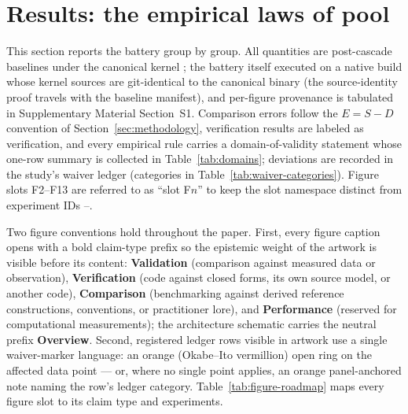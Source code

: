 \section{Results: the empirical laws of pool}
\label{sec:results}

This section reports the battery group by group. All quantities are
post-cascade baselines under the canonical kernel ;
the battery itself executed on a native build whose kernel sources are
git-identical to the canonical binary (the source-identity proof travels
with the baseline manifest), and per-figure provenance is tabulated in
Supplementary Material Section~S1. Comparison errors follow the
$E = S - D$ convention of Section~\ref{sec:methodology}, verification
results are labeled as verification, and every empirical rule carries a
domain-of-validity statement whose one-row summary is collected in
Table~\ref{tab:domains}; deviations are recorded in the study's waiver
ledger (categories in Table~\ref{tab:waiver-categories}). Figure slots F2--F13 are referred to as ``slot F$n$'' to keep the
slot namespace distinct from experiment IDs --.

Two figure conventions hold throughout the paper. First, every figure
caption opens with a bold claim-type prefix so the epistemic weight of
the artwork is visible before its content: \textbf{Validation}
(comparison against measured data or observation), \textbf{Verification}
(code against closed forms, its own source model, or another code),
\textbf{Comparison} (benchmarking against derived reference
constructions, conventions, or practitioner lore), and
\textbf{Performance} (reserved for computational measurements); the
architecture schematic carries the neutral prefix \textbf{Overview}.
Second, registered ledger rows visible in artwork use a single
waiver-marker language: an orange (Okabe--Ito vermillion) open ring on
the affected data point --- or, where no single point applies, an
orange panel-anchored note naming the row's ledger category. Table~\ref{tab:figure-roadmap}
maps every figure slot to its claim type and experiments.

